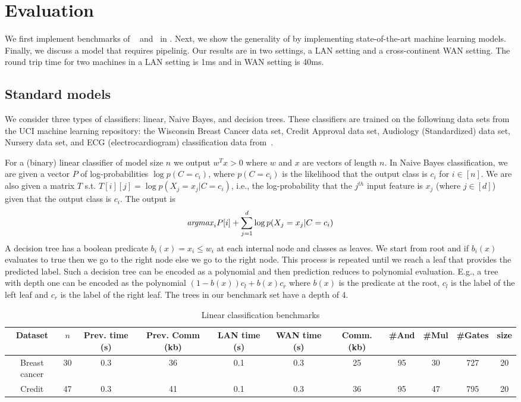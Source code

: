 \section{Evaluation}
\label{sec:eval}

We first implement benchmarks of ~\cite{shafindss} and~\cite{minionn} in \tool.
Next, we show the generality of \tool by implementing state-of-the-art machine learning models.
Finally, we discuss a model that requires pipelinig.
Our results are in two settings, a LAN setting and a cross-continent WAN setting.
The round trip time for two machines in a LAN setting is 1ms and in WAN setting is 40ms.

\subsection{Standard models}
\label{sec:shallow}
We consider three types of classifiers: linear, Naive Bayes, and decision trees. 
These classifiers are trained on the followinng data sets from the UCI  machine learning repository:
 the Wisconsin Breast Cancer data set, 
Credit Approval data set, Audiology (Standardized) data set, Nursery data set, and
ECG (electrocardiogram) classification data from~\cite{barni}.

For a  (binary) linear classifier of model size $n$ we output $w^Tx>0$ where $w$ and $x$ are vectors
of length $n$. In Naive Bayes classification, we are given a vector $P$ of log-probabilities
$\log p(C=c_i)$, where $p(C=c_i)$ is the likelihood that the output class is $c_i$ for $i\in[n]$. 
We are also given a matrix $T$ s.t. $T[i][j]=\log p(X_j=x_j|C=c_i)$, i.e., the log-probability that 
the $j^{th}$ input feature is $x_j$ (where $j\in [d]$) given that the output class is $c_i$. The output is
\[
{\it argmax}_i P[i]+\sum_{j=1}^d\log p(X_j=x_j|C=c_i)
\]
A decision tree has a boolean predicate $b_i(x) = x_i\leq w_i$ at each internal node and classes as leaves.
We start from root and if $b_i(x)$ evaluates to true then we go to the right node else
we go to the right node. This process is repeated until we reach a leaf that provides
the predicted label. Such a decision tree can be encoded as a polynomial and then prediction
reduces to polynomial evaluation. E.g., a tree with depth one can be encoded as the polynomial
$(1-b(x))c_l + b(x)c_r$ where $b(x)$ is the predicate at the root, $c_l$ is the label of the left leaf
and $c_r$ is the label of the right leaf. The trees in our benchmark set have a depth of 4.

\begin{table*}
\begin{tabular}{c|c|c|c|c |c|c|c|c|c|c}
Dataset & $n$  & Prev. time (s) & Prev. Comm (kb) & LAN time (s) & WAN time (s) & Comm. (kb)  & \#And & \#Mul & \#Gates & size\\
\hline
Breast cancer & 30 & 0.3 & 36 & 0.1 & 0.3 & 25 & 95 & 30 & 727 & 20\\
\hline
Credit & 47 & 0.3 & 41 & 0.1 & 0.3 & 36 & 95 & 47 & 795 & 20\\
\hline
\end{tabular}

 \caption{Linear classification benchmarks}
 \label{tab:lcd} 
\end{table*}

